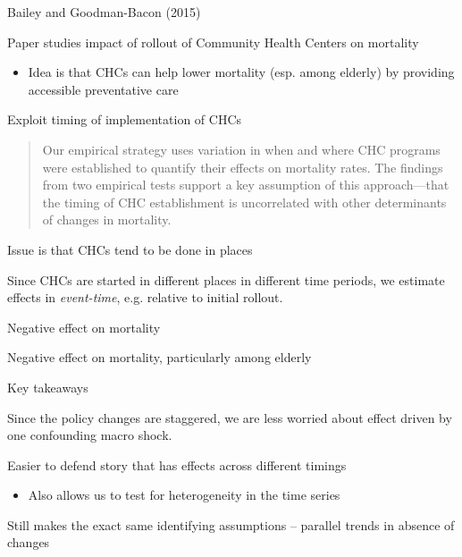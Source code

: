 \documentclass[notes,11pt, aspectratio=169]{beamer}
\newenvironment{wideitemize}{\itemize\addtolength{\itemsep}{10pt}}{\enditemize}
\begin{document}
\begin{frame}{Bailey and Goodman-Bacon (2015)}
  \begin{wideitemize}
  \item Paper studies  impact of rollout of Community Health Centers on mortality
    \begin{itemize}
    \item Idea is that CHCs can help lower mortality (esp. among
      elderly) by providing accessible preventative care
    \end{itemize}
  \item Exploit timing of implementation of CHCs
    \begin{quote}
        Our empirical strategy uses variation in when and where CHC
        programs were established to quantify their effects on
        mortality rates. The findings from two empirical tests support
        a key assumption of this approach—that the timing of CHC
        establishment is uncorrelated with other determinants of
        changes in mortality.
      \end{quote}
    \item Issue is that CHCs tend to be done in places
    \item Since CHCs are started in different places in different time
      periods, we estimate effects in \emph{event-time}, e.g. relative
      to initial rollout.
  \end{wideitemize}
\end{frame}

\begin{frame}{Negative effect on mortality}
\end{frame}
\begin{frame}{Negative effect on mortality, particularly among elderly}
\end{frame}

\begin{frame}{Key takeaways}
  \begin{wideitemize}

  \item Since the policy changes are staggered, we are less worried about effect driven by one confounding macro shock.
  \item Easier to defend story that has effects across different timings
    \begin{itemize}
    \item Also allows us to test for heterogeneity in the time series
    \end{itemize}
  \item Still makes the exact same identifying assumptions -- parallel
    trends in absence of changes
  \end{wideitemize}
\end{frame}
\end{document}
